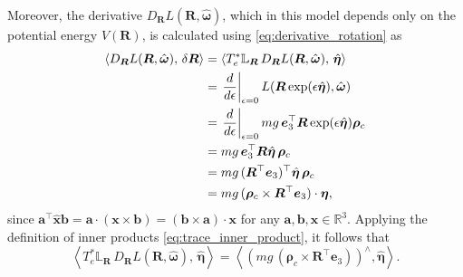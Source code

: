 \indent Moreover, the derivative $D_{\bm{R}}L(\bm{R},\hat{\bm{\omega}})$, which in this model depends only on the potential energy $V(\bm{R})$, is calculated using \eqref{eq:derivative_rotation} as
\begin{align}
\left\langle D_{\bm{R}} L(\bm{R},\hat{\bm{\omega}}),\,\delta \bm{R}\right\rangle
&=
\left\langle T_{e}^{*}\mathbb{L}_{\bm{R}}\,D_{\bm{R}} L(\bm{R},\hat{\bm{\omega}}),\, \hat{\bm{\eta}} \right\rangle \notag\\
&=
\left.\frac{d}{d\epsilon}\right|_{\epsilon=0}
L\!\left(\bm{R}\exp(\epsilon\hat{\bm{\eta}}),\hat{\bm{\omega}}\right) \notag\\
&=
\left.\frac{d}{d\epsilon}\right|_{\epsilon=0}
mg\,\bm{e}_3^{\top}\bm{R}\exp(\epsilon\hat{\bm{\eta}})\bm{\rho}_c \notag\\
&=
mg\,\bm{e}_3^{\top}\bm{R}\hat{\bm{\eta}}\,\bm{\rho}_c \notag\\
&=
mg\,(\bm{R}^{\top}\bm{e}_3)^{\top}\hat{\bm{\eta}}\,\bm{\rho}_c \notag\\
&=
mg\,(\bm{\rho}_c\times \bm{R}^{\top}\bm{e}_3)\cdot \bm{\eta}, \notag
\end{align}
since $\bm{a}^\top \hat{\bm{x}}\bm{b} = \bm{a} \cdot(\bm{x} \times \bm{b}) = (\bm{b} \times \bm{a}) \cdot \bm{x}$ for any $\bm{a}, \bm{b}, \bm{x} \in \mathbb{R}^3$. Applying the definition of inner products \eqref{eq:trace_inner_product}, it follows that 
\begin{equation}\label{eq:continuous_3D_pendulum_derivative_rotation}
    \left\langle T_{e}^{*}\mathbb{L}_{\bm{R}}\,D_{\bm{R}} L(\bm{R},\hat{\bm{\omega}}),\, \hat{\bm{\eta}} \right\rangle
    = \left\langle (mg\,(\bm{\rho}_c\times \bm{R}^{\top}\bm{e}_3))^\wedge, \hat{\bm{\eta}}\right\rangle.
\end{equation}

